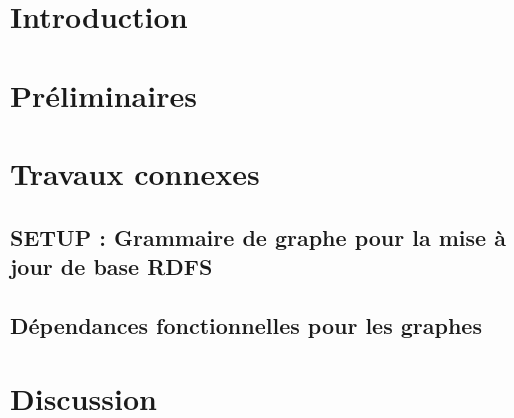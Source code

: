 \section{Introduction}

\vfill
\pagebreak
\section{Préliminaires}
\label{sec:update:pre}


\section{Travaux connexes}
\label{sec:update:soa}


\subsection{SETUP : Grammaire de graphe pour la mise à jour de base RDFS}
\label{sec:update:soa:sendup}


\subsection{Dépendances fonctionnelles pour les graphes}
\label{sec:update:soa:graphdeps}


\section{Discussion}
\label{sec:update:discussion}

